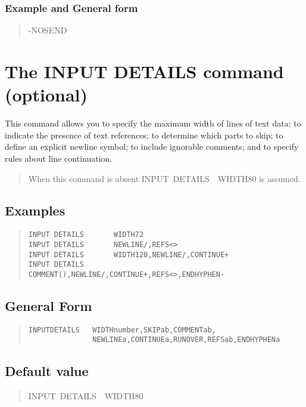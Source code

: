 \subsubsection{Example and General form}
\begin{quote}
-NOSEND
\end{quote}

\section{The INPUT DETAILS command (optional)}
\label{input}
This command allows you to specify the maximum width of lines
of text data; to indicate the presence of text references; to determine
which parts to skip; to define an explicit newline symbol; to include
ignorable comments; and to specify rules about line continuation.
\begin{quote}
When this command is absent INPUT~DETAILS~~WIDTH80 is assumed.
\end{quote}

\subsection{Examples}
\begin{quote}
\begin{verbatim}
INPUT DETAILS       WIDTH72
INPUT DETAILS       NEWLINE/,REFS<>
INPUT DETAILS       WIDTH128,NEWLINE/,CONTINUE+
INPUT DETAILS       COMMENT(),NEWLINE/,CONTINUE+,REFS<>,ENDHYPHEN-
\end{verbatim}
\end{quote}

\subsection{General Form}
\begin{quote}
\begin{verbatim}
INPUTDETAILS   WIDTHnumber,SKIPab,COMMENTab,
               NEWLINEa,CONTINUEa,RUNOVER,REFSab,ENDHYPHENa
\end{verbatim}
\end{quote}

\subsection{Default value}
\begin{quote}
INPUT~DETAILS~~WIDTH80
\end{quote}

